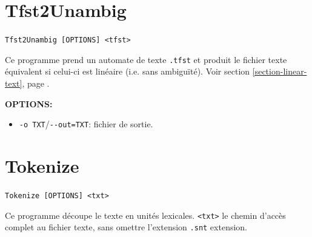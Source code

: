 \section{Tfst2Unambig}
\verb+Tfst2Unambig [OPTIONS] <tfst>+

\bigskip
\noindent Ce programme prend un automate de texte \verb$.tfst$ et produit le fichier texte équivalent si celui-ci est linéaire (i.e. sans ambiguïté). Voir section \ref{section-linear-text}, page \pageref{section-linear-text}.

\bigskip
\noindent \textbf{OPTIONS:}
\begin{itemize}
\item \verb+-o TXT+/\verb+--out=TXT+: fichier de sortie.
\end{itemize}







\section{Tokenize}
\label{section-Tokenize}
\verb+Tokenize [OPTIONS] <txt>+

\bigskip
\noindent Ce programme découpe le texte en unités lexicales.
\verb+<txt>+ le chemin d’accès complet au fichier texte, sans omettre l’extension \verb+.snt+ 
extension.

